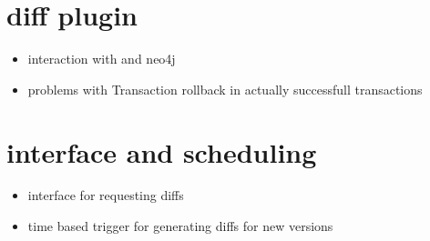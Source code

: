 	\begin{comment}
	\begin{itemize}
		\item generic ontology import for COMODI
		\item some helper methods/functions
	\end{itemize}
	\end{comment}

\section{\masymos diff plugin}
	\label{sec:impl:diff}
	
	
	\begin{itemize}
		\item interaction with \bives and neo4j
		\item problems with Transaction rollback in actually successfull transactions
	\end{itemize}

\section{\rest interface and scheduling}
	\label{sec:impl:rest}
	\begin{itemize}
		\item \rest interface for requesting diffs
		\item time based trigger for generating diffs for new versions
	\end{itemize}

